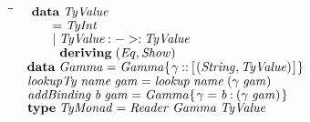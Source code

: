 \documentclass[10pt]{article}
\newlength{\lwidth}\setlength{\lwidth}{4.5cm}
\newlength{\cwidth}\setlength{\cwidth}{8mm} %
\newcommand{\Conid}[1]{\mathit{#1}}
\newcommand{\Varid}[1]{\mathit{#1}}
\begin{document}
\begin{tabbing}
\qquad\=\hspace{\lwidth}\=\hspace{\cwidth}\=\+\kill
${\hskip1.00em\relax\mathbf{data}\;\Conid{TyValue}}$\\
${\hskip1.00em\relax\hskip2.00em\relax\mathrel{=}\Conid{TyInt}}$\\
${\hskip1.00em\relax\hskip2.00em\relax\mid \Conid{TyValue}\mathbin{:->:}\Conid{TyValue}}$\\
${\hskip1.00em\relax\hskip2.00em\relax\phantom{\mid \mbox{}}\mathbf{deriving}\;(\Conid{Eq},\Conid{Show})}$\\
${}$\\
${\hskip1.00em\relax\mathbf{data}\;\Conid{Gamma}\mathrel{=}\Conid{Gamma}\{\mskip1.5mu \Varid{\gamma}\mathbin{::}[\mskip1.5mu (\Conid{String},\Conid{TyValue})\mskip1.5mu]\mskip1.5mu\}}$\\
${}$\\
${\hskip1.00em\relax\Varid{lookupTy}\;\Varid{name}\;\Varid{gam}\mathrel{=}\Varid{lookup}\;\Varid{name}\;(\Varid{\gamma}\;\Varid{gam})}$\\
${}$\\
${\hskip1.00em\relax\Varid{addBinding}\;\Varid{b}\;\Varid{gam}\mathrel{=}\Conid{Gamma}\{\mskip1.5mu \Varid{\gamma}\mathrel{=}\Varid{b}\mathbin{:}(\Varid{\gamma}\;\Varid{gam})\mskip1.5mu\}}$\\
${}$\\
${\hskip1.00em\relax\mathbf{type}\;\Conid{TyMonad}\mathrel{=}\Conid{Reader}\;\Conid{Gamma}\;\Conid{TyValue}}$
\end{tabbing}
\end{document}
